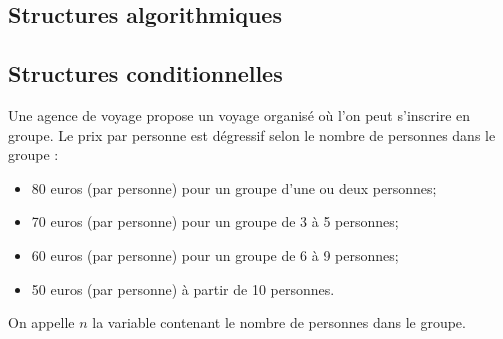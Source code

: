 \ifprof
\vspace{1cm}
\else
\begin{multicols}{2}
\fi


\section*{Structures algorithmiques}
\subsection*{Structures conditionnelles}
\ifprof
\begin{corrige}
\end{corrige}
\else
\fi


        Une agence de voyage propose un voyage organisé où l’on peut s’inscrire en groupe. Le prix par personne est
dégressif selon le nombre de personnes dans le groupe :
\begin{itemize}
\item 80 euros (par personne) pour un groupe d'une ou deux personnes; 
\item 70 euros (par personne) pour un groupe de 3 à 5 personnes; 
\item 60 euros (par personne) pour un groupe de 6 à 9 personnes; 
\item 50 euros (par personne) à partir de 10 personnes.  
\end{itemize}
 On appelle $n$ la variable
contenant le nombre de personnes dans le groupe. 

\ifprof
\begin{corrige}
\end{corrige}
\else
\fi

\ifprof
\begin{corrige}
\end{corrige}
\else
\fi

\ifprof
\begin{corrige}
\end{corrige}
\else
\fi


\end{multicols}
